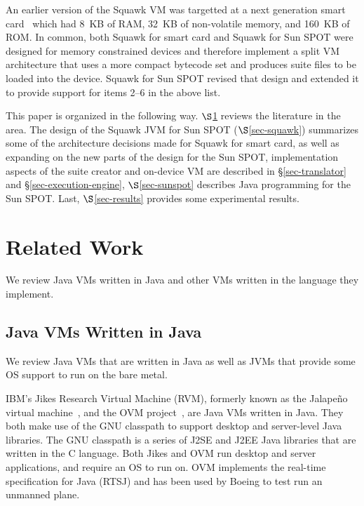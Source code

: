 \documentclass{sigplanconf}
\begin{document}
An earlier version of the Squawk VM was targetted at a next generation 
smart card~\cite{Shay03} which had 8~KB of RAM, 32~KB of non-volatile 
memory, and 160~KB of ROM.  
In common, both Squawk for smart card and Squawk for Sun SPOT were 
designed for memory constrained devices and therefore implement a split VM 
architecture that uses a more compact bytecode set and produces suite 
files to be loaded into the device.  
Squawk for Sun SPOT revised that design and extended it to provide support
for items 2--6 in the above list.

This paper is organized in the following way.  
$\S$\ref{sec-other-work} reviews the literature in the area. 
The design of the Squawk JVM for Sun SPOT ($\S$\ref{sec-squawk})
summarizes some of the architecture decisions made for Squawk for 
smart card, as well as expanding on the new parts of the design 
for the Sun SPOT,
implementation aspects of the suite creator and on-device VM  
are described in \S\ref{sec-translator} and \S\ref{sec-execution-engine},
$\S$\ref{sec-sunspot} describes Java programming for the
Sun SPOT.
Last, $\S$\ref{sec-results} provides some experimental results.


\section{Related Work}
\label{sec-other-work}

We review Java VMs written in Java and other VMs written in 
the language they implement.

\subsection{Java VMs Written in Java}

We review Java VMs that are written in Java as well as JVMs that
provide some OS support to run on the bare metal.

IBM's Jikes Research Virtual Machine (RVM), formerly known as
the Jalape\~{n}o virtual machine~\cite{Alpe99,Alpe00}, and the
OVM project~\cite{Pala03,Flack03}, are Java VMs written in Java.
They both make use of the GNU classpath to support desktop
and server-level Java libraries.
The GNU classpath is a series of J2SE and J2EE Java libraries
that are written in the C language.
Both Jikes and OVM run desktop and server applications, and require an OS
to run on.
OVM implements the real-time specification for Java (RTSJ) and
has been used by Boeing to test run an unmanned plane.
\end{document}
